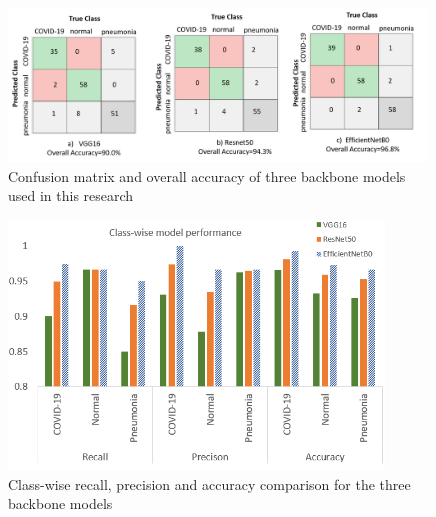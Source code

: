 \begin{figure}
\centering
\includegraphics[width=0.99\textwidth]{images/CM_3 models_v2.png}
   \caption{Confusion matrix and overall accuracy of three backbone models used in this research}
\label{fig:confusionmatrix}
\end{figure}
\begin{figure}
\centering
\includegraphics[width=0.89\textwidth]{images/Class-wise performance.PNG}
   \caption{Class-wise recall, precision and accuracy comparison for the three backbone models}
\label{fig:comparison}
\end{figure}




